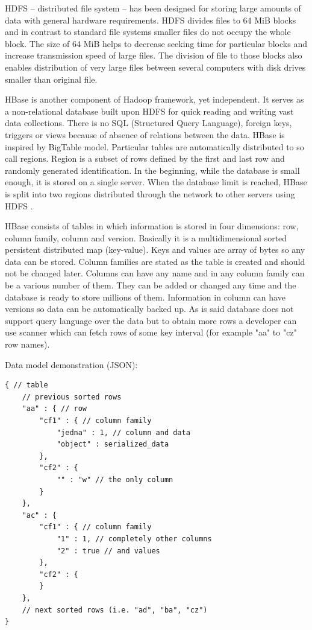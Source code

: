 \documentclass{llncs}
\begin{document}
HDFS – distributed file system – has been designed for storing large amounts
of data with general hardware requirements. HDFS divides files to 64 MiB
blocks and in contrast to standard file systems smaller files do not occupy
the whole block. The size of 64 MiB helps to decrease seeking time for
particular blocks and increase transmission speed of large files. The division
of file to those blocks also enables distribution of very large files between
several computers with disk drives smaller than original file.

HBase is another component of Hadoop framework, yet independent. It serves as
a non-relational database built upon HDFS for quick reading and writing vast
data collections. There is no SQL (Structured Query Language), foreign keys,
triggers or views because of absence of relations between the data. HBase is
inspired by BigTable model. Particular tables are automatically distributed to
so call regions. Region is a subset of rows defined by the first and last row
and randomly generated identification. In the beginning, while the database is
small enough, it is stored on a single server. When the database limit is
reached, HBase is split into two regions distributed through the network to
other servers using HDFS \cite{white2009hadoop}.

HBase consists of tables in which information is stored in four dimensions:
row, column family, column and version. Basically it is a multidimensional
sorted persistent distributed map (key-value). Keys and values are array of
bytes so any data can be stored. Column families are stated as the table is
created and should not be changed later. Columns can have any name and in any
column family can be a various number of them. They can be added or changed
any time and the database is ready to store millions of them. Information in
column can have versions so data can be automatically backed up. As is said
database does not support query language over the data but to obtain more rows
a developer can use scanner which can fetch rows of some key interval (for
example "aa" to "cz" row names).

Data model demonstration (JSON):
\begin{lstlisting}
{ // table
	// previous sorted rows
	"aa" : { // row
		"cf1" : { // column family
			"jedna" : 1, // column and data
			"object" : serialized_data
		},
		"cf2" : {
			"" : "w" // the only column
		}
	},
	"ac" : {
		"cf1" : { // column family
			"1" : 1, // completely other columns
			"2" : true // and values
		},
		"cf2" : {
		}
	},
	// next sorted rows (i.e. "ad", "ba", "cz")
}
\end{lstlisting}
\end{document}

